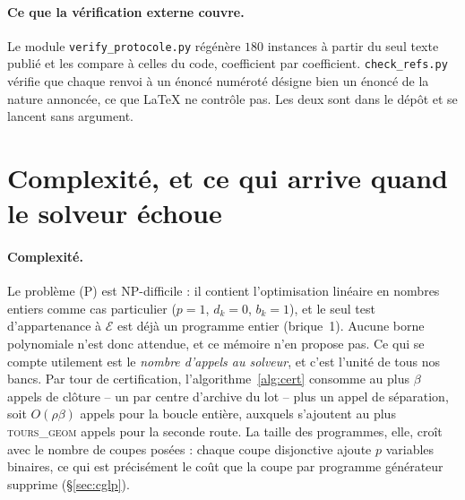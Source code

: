 \documentclass[11pt,a4paper]{article}
\theoremstyle{plain}
\theoremstyle{remark}
\newcommand{\Ecal}{\mathcal{E}}
\begin{document}
\paragraph{Ce que la vérification externe couvre.} Le module
\texttt{verify\_protocole.py} régénère $180$ instances à partir du seul
texte publié et les compare à celles du code, coefficient par coefficient.
\texttt{check\_refs.py} vérifie que chaque renvoi à un énoncé numéroté
désigne bien un énoncé de la nature annoncée, ce que \LaTeX{} ne contrôle
pas. Les deux sont dans le dépôt et se lancent sans argument.

\section{Complexité, et ce qui arrive quand le solveur échoue}
\label{sec:complexite}

\paragraph{Complexité.} Le problème (P) est \textsf{NP}-difficile : il
contient l'optimisation linéaire en nombres entiers comme cas particulier
($p=1$, $d_k=0$, $b_k=1$), et le seul test d'appartenance à $\Ecal$ est
déjà un programme entier (brique~1). Aucune borne polynomiale n'est donc
attendue, et ce mémoire n'en propose pas. Ce qui se compte utilement est
le \emph{nombre d'appels au solveur}, et c'est l'unité de tous nos bancs.
Par tour de certification, l'algorithme~\ref{alg:cert} consomme au plus
$\beta$ appels de clôture -- un par centre d'archive du lot -- plus un
appel de séparation, soit $O(\rho\beta)$ appels pour la boucle entière,
auxquels s'ajoutent au plus \textsc{tours\_geom} appels pour la seconde
route. La taille des programmes, elle, croît avec le nombre de coupes
posées : chaque coupe disjonctive ajoute $p$ variables binaires, ce qui
est précisément le coût que la coupe par programme générateur supprime
(§\ref{sec:cglp}).
\end{document}
